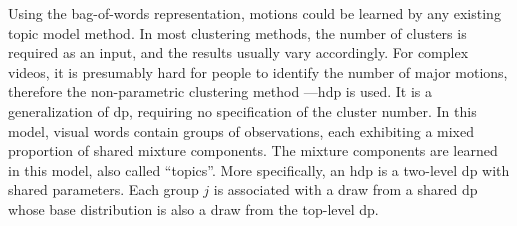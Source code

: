 Using the bag-of-words representation, motions could be learned by any existing topic model method. 
In most clustering methods, the number of clusters is required as an input, and the results usually vary accordingly. For complex videos, it is presumably hard for people to identify the number of major motions, therefore the non-parametric clustering method ---\gls{hdp} is used. 
It is a generalization of \gls{dp}, requiring no specification of the cluster number. 
In this model, visual words contain groups of observations, each exhibiting a mixed proportion of shared mixture components. 
The mixture components are learned in this model, also called ``topics''. 
More specifically, an \gls{hdp} is a two-level \gls{dp} with shared parameters. Each group $j$ is associated with a draw from a shared \gls{dp} whose base distribution is also a draw from the top-level \gls{dp}.
